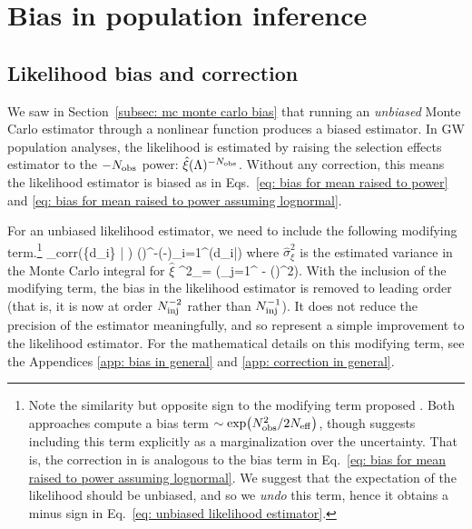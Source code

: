 \section{Bias in population inference}
\label{sec: mc bias in population inference}


\subsection{Likelihood bias and correction}

We saw in Section~\ref{subsec: mc monte carlo bias} that running an \textit{unbiased} Monte Carlo estimator through a nonlinear function produces a biased estimator. In \ac{GW} population analyses, the likelihood is estimated by raising the selection effects estimator to the $-N_{\rm obs}$ power: $\hat{\xi}(\Lambda)^{-N_{\rm obs}}$.
Without any correction, this means the likelihood estimator is biased as in Eqs.~\ref{eq: bias for mean raised to power} and \ref{eq: bias for mean raised to power assuming lognormal}. 

For an unbiased likelihood estimator, we need to include the following modifying term.\footnote{Note the similarity but opposite sign to the modifying term proposed \citet{Farr:2019rap}. Both approaches compute a bias term $\sim \exp(N_{\rm obs}^2/2N_{\rm eff})$, though \citet{Farr:2019rap} suggests including this term explicitly as a marginalization over the uncertainty. That is, the correction in \citet{Farr:2019rap} is analogous to the bias term in Eq.~\ref{eq: bias for mean raised to power assuming lognormal}. We suggest that the expectation of the likelihood should be unbiased, and so we \textit{undo} this term, hence it obtains a minus sign in Eq.~\ref{eq: unbiased likelihood estimator}.}
\beq
{}_{\rm corr}(\{d_i\} | \Lambda) \equiv \hat{\xi}(\Lambda)^{-\Nobs}\exp\left(-\right)\prod_{i=1}^{\Nobs}(d_i|\Lambda)
\label{eq: unbiased likelihood estimator}
\eeq
where $\hat{\sigma}^2_{\xi}$ is the estimated variance in the Monte Carlo integral for $\hat{\xi}$
\beq
\hat{\sigma}^2_\xi = \left(\sum_{j=1}^{\Ninj} - \hat{\xi}(\Lambda)^2\right).
\eeq
With the inclusion of the modifying term, the bias in the likelihood estimator is removed to leading order (that is, it is now at order $N_{\rm inj}^{-2}$ rather than $N_{\rm inj}^{-1}$). It does not reduce the precision of the estimator meaningfully, and so represent a simple improvement to the likelihood estimator. For the mathematical details on this modifying term, see the Appendices \ref{app: bias in general} and \ref{app: correction in general}.

